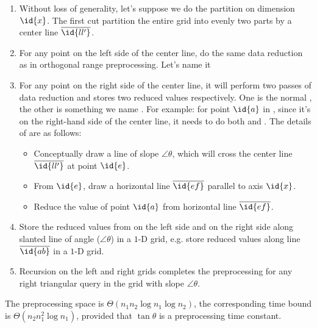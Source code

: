 \begin{enumerate}
\item Without loss of generality, let's suppose we do the partition on 
  dimension $\id{x}$. The first cut partition the entire grid into evenly
  two parts by a center line $\overline{\id{ll'}}$.
\item For any point on the left side of the center line, do the same data
  reduction as in orthogonal range preprocessing. Let's name it 
\item For any point on the right side of the center line, it will perform
  two passes of data reduction and stores two reduced values respectively.
  One is the normal , the other is something
  we name . For example: for point $\id{a}$
  in , since it's on the right-hand side of
  the center line, it needs to do both  and
  . The details of 
  are as follows: 
    \begin{itemize}
    \item Conceptually draw a line of slope $\angle\theta$, which will 
      cross the center line $\overline{\id{ll'}}$ at point $\id{e}$.
    \item From $\id{e}$, draw a horizontal line $\overline{\id{ef}}$
      parallel to axis $\id{x}$.
    \item Reduce the value of point $\id{a}$ from horizontal line 
      $\overline{\id{ef}}$. 
    \end{itemize} 
\item Store the reduced values from  on the
  left side and  on the right side along
  slanted line of angle ($\angle\theta$) in a $1$-D grid, e.g. store reduced
  values along line $\overline{\id{ab}}$ in a $1$-D grid.
\item Recursion on the left and right grids completes the preprocessing
  for any right triangular query in the grid with slope $\angle\theta$.
\end{enumerate}

\begin{theorem}
The preprocessing space is $\Theta(n_1 n_2 \log n_1 \log n_2)$, the
corresponding time bound is $\Theta(n_2 n_1^2 \log n_1)$, provided that 
$\tan \theta$ is a preprocessing time constant.
\end{theorem}


